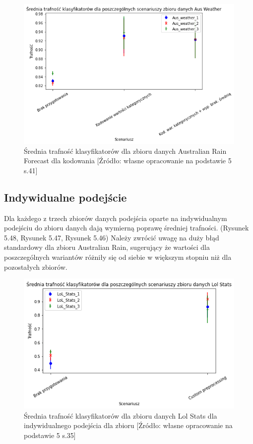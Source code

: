 \documentclass[oneside]{book}
\begin{document}
\begin{figure}[H]
    \centerline{\includegraphics[scale=0.8]{Aus_Weather_Avg_Kodowanie}}
    \centering
    \caption{Średnia trafność klasyfikatorów dla zbioru danych Australian Rain Forecast 
    dla kodowania
    [Źródło: własne opracowanie na podstawie 5 s.41]}
    \end{figure}


\subsection{Indywidualne podejście}

Dla każdego z trzech zbiorów danych podejścia 
oparte na indywidualnym podejściu do zbioru 
danych dają wymierną poprawę średniej trafności.
(Rysunek 5.48, Rysunek 5.47, Rysunek 5.46)
Należy zwrócić uwagę na duży błąd standardowy dla zbioru Australian Rain,
 sugerujący że wartości dla poszczególnych wariantów różniły 
 się od siebie w większym stopniu niż dla pozostałych zbiorów. 


\begin{figure}[H]
    \centerline{\includegraphics[scale=0.8]{Lol_Stats_Avg_Custom}}
    \centering
    \caption{Średnia trafność klasyfikatorów dla zbioru danych Lol Stats 
    dla indywidualnego podejścia dla zbioru
    [Źródło: własne opracowanie na podstawie 5 s.35]}
    \end{figure}
\end{document}
